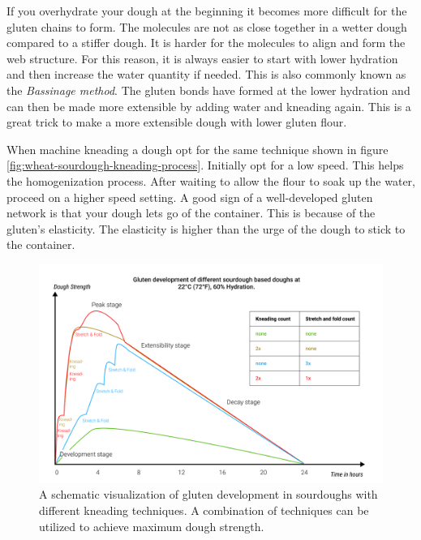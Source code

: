 If you overhydrate your dough at the beginning it becomes more difficult
for the gluten chains to form. The molecules are not as close together in
a wetter dough compared to a stiffer dough. It is harder for the molecules
to align and form the web structure. For this reason, it is always easier
to start with lower hydration and then increase the water quantity if needed.
This is also commonly known as the \textit{Bassinage method}. The gluten
bonds have formed at the lower hydration and can then be made more extensible
by adding water and kneading again. This is a great trick to make
a more extensible dough with lower gluten flour. \cite{bassinage+technique}

When machine kneading a dough opt for the same technique shown in figure \ref*{fig:wheat-sourdough-kneading-process}.
Initially opt for a low speed. This helps the homogenization process.
After waiting to allow the flour to soak up the water, proceed on a higher speed
setting. A good sign of a well-developed gluten network is
that your dough lets go of the container. This is because of the gluten's elasticity.
The elasticity is higher than the urge of the
dough to stick to the container. 

\begin{figure}[!htb]
  \includegraphics[width=\textwidth]{dough-strength-sourdough}
  \caption{A schematic visualization of
  gluten development in sourdoughs with different kneading techniques.
  A combination of techniques can be utilized to achieve maximum
  dough strength.
  }
\end{figure}

